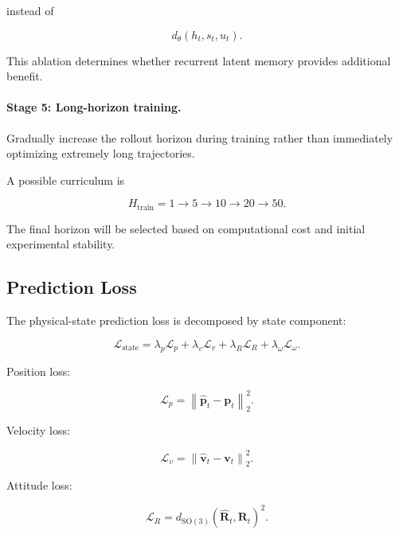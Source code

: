 \documentclass[conference]{IEEEtran}
\newcommand{\SO}{\mathrm{SO}(3)}
\begin{document}
instead of

\begin{equation}
d_{\theta}(h_t,s_t,u_t).
\end{equation}

This ablation determines whether recurrent latent memory provides
additional benefit.

\paragraph{Stage 5: Long-horizon training.}

Gradually increase the rollout horizon during training rather than
immediately optimizing extremely long trajectories.

A possible curriculum is

\begin{equation}
H_{\mathrm{train}}
=
1
\rightarrow
5
\rightarrow
10
\rightarrow
20
\rightarrow
50.
\end{equation}

The final horizon will be selected based on computational cost and
initial experimental stability.


\subsection{Prediction Loss}

The physical-state prediction loss is decomposed by state component:

\begin{equation}
\mathcal{L}_{\mathrm{state}}
=
\lambda_p\mathcal{L}_p
+
\lambda_v\mathcal{L}_v
+
\lambda_R\mathcal{L}_R
+
\lambda_\omega\mathcal{L}_\omega.
\end{equation}

Position loss:

\begin{equation}
\mathcal{L}_p
=
\left\|
\hat{\mathbf p}_t-\mathbf p_t
\right\|_2^2.
\end{equation}

Velocity loss:

\begin{equation}
\mathcal{L}_v
=
\left\|
\hat{\mathbf v}_t-\mathbf v_t
\right\|_2^2.
\end{equation}

Attitude loss:

\begin{equation}
\mathcal{L}_R
=
d_{\SO}
(\hat{\mathbf R}_t,\mathbf R_t)^2.
\end{equation}
\end{document}
